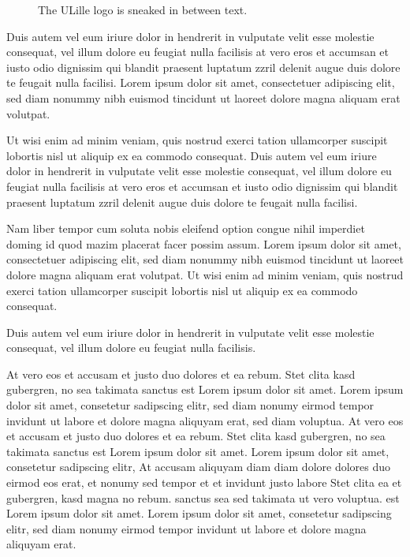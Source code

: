 \begin{wrapfigure}{r}{0.25\textwidth}
    \def\svgwidth{0.25\textwidth}
    

    \caption{The ULille logo is sneaked in between text.}
    \label{fig:HPIwrap}
\end{wrapfigure}

Duis autem vel eum iriure dolor in hendrerit in vulputate velit esse molestie consequat, vel illum dolore eu feugiat nulla facilisis at vero eros et accumsan et iusto odio dignissim qui blandit praesent luptatum zzril delenit augue duis dolore te feugait nulla facilisi. Lorem ipsum dolor sit amet, consectetuer adipiscing elit, sed diam nonummy nibh euismod tincidunt ut laoreet dolore magna aliquam erat volutpat.

Ut wisi enim ad minim veniam, quis nostrud exerci tation ullamcorper suscipit lobortis nisl ut aliquip ex ea commodo consequat. Duis autem vel eum iriure dolor in hendrerit in vulputate velit esse molestie consequat, vel illum dolore eu feugiat nulla facilisis at vero eros et accumsan et iusto odio dignissim qui blandit praesent luptatum zzril delenit augue duis dolore te feugait nulla facilisi.

Nam liber tempor cum soluta nobis eleifend option congue nihil imperdiet doming id quod mazim placerat facer possim assum. Lorem ipsum dolor sit amet, consectetuer adipiscing elit, sed diam nonummy nibh euismod tincidunt ut laoreet dolore magna aliquam erat volutpat. Ut wisi enim ad minim veniam, quis nostrud exerci tation ullamcorper suscipit lobortis nisl ut aliquip ex ea commodo consequat.

Duis autem vel eum iriure dolor in hendrerit in vulputate velit esse molestie consequat, vel illum dolore eu feugiat nulla facilisis.

At vero eos et accusam et justo duo dolores et ea rebum. Stet clita kasd gubergren, no sea takimata sanctus est Lorem ipsum dolor sit amet. Lorem ipsum dolor sit amet, consetetur sadipscing elitr, sed diam nonumy eirmod tempor invidunt ut labore et dolore magna aliquyam erat, sed diam voluptua. At vero eos et accusam et justo duo dolores et ea rebum. Stet clita kasd gubergren, no sea takimata sanctus est Lorem ipsum dolor sit amet. Lorem ipsum dolor sit amet, consetetur sadipscing elitr, At accusam aliquyam diam diam dolore dolores duo eirmod eos erat, et nonumy sed tempor et et invidunt justo labore Stet clita ea et gubergren, kasd magna no rebum. sanctus sea sed takimata ut vero voluptua. est Lorem ipsum dolor sit amet. Lorem ipsum dolor sit amet, consetetur sadipscing elitr, sed diam nonumy eirmod tempor invidunt ut labore et dolore magna aliquyam erat.

